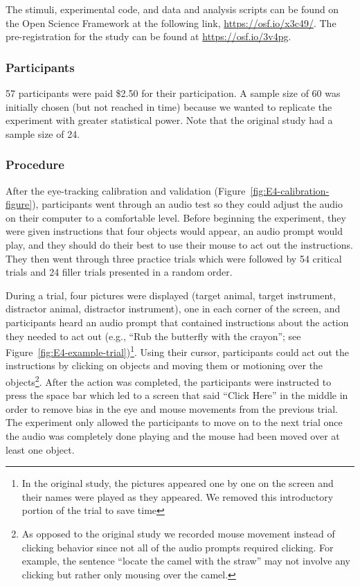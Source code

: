\documentclass[
  man,floatsintext]{apa6}
\begin{document}
The stimuli, experimental code, and data and analysis scripts can be
found on the Open Science Framework at the following link,
\url{https://osf.io/x3c49/}. The pre-registration
for the study can be found at \url{https://osf.io/3v4pg}.

\hypertarget{participants-4}{%
\subsubsection{Participants}\label{participants-4}}

57 participants were paid \$2.50 for their participation. A sample size of 60 was initially chosen (but not reached in time) because we wanted to replicate the experiment with greater statistical power. Note that the original study had a sample size of 24.

\hypertarget{procedure-3}{%
\subsubsection{Procedure}\label{procedure-3}}

After the eye-tracking calibration and validation (Figure~\ref{fig:E4-calibration-figure}), participants went through an audio
test so they could adjust the audio on their computer to a comfortable
level. Before beginning the experiment, they were given instructions
that four objects would appear, an audio prompt would play, and they
should do their best to use their mouse to act out the instructions.
They then went through three practice trials which were followed by 54
critical trials and 24 filler trials presented in a random order.

During a trial, four pictures were displayed (target animal, target
instrument, distractor animal, distractor instrument), one in each
corner of the screen, and participants heard an audio prompt that
contained instructions about the action they needed to act out (e.g.,
``Rub the butterfly with the crayon''; see Figure~\ref{fig:E4-example-trial})\footnote{In the original study, the pictures appeared one by one on the
  screen and their names were played as they appeared. We removed this
  introductory portion of the trial to save time}. Using their
cursor, participants could act out the instructions by clicking on
objects and moving them or motioning over the objects\footnote{As opposed to the original study we recorded mouse movement
  instead of clicking behavior since not all of the audio prompts
  required clicking. For example, the sentence ``locate the camel with
  the straw'' may not involve any clicking but rather only mousing over
  the camel.}. After the
action was completed, the participants were instructed to press the
space bar which led to a screen that said ``Click Here'' in the middle in
order to remove bias in the eye and mouse movements from the previous
trial. The experiment only allowed the participants to move on to the
next trial once the audio was completely done playing and the mouse had
been moved over at least one object.
\end{document}
